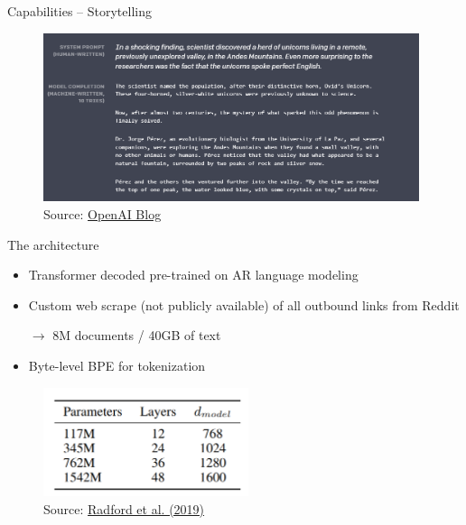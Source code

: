 \begin{frame}{Capabilities -- Storytelling}

\vfill

\begin{figure}
\centering
\includegraphics[width = 11cm]{figure/gpt2-story.png}\\ 
\footnotesize{Source:} \href{https://openai.com/blog/better-language-models/\#sample1}{\footnotesize OpenAI Blog}
\end{figure}

\vfill

\end{frame}


\begin{frame}{The architecture}

\vfill

\begin{itemize}
	\item Transformer decoded pre-trained on AR language modeling
	\item Custom web scrape (not publicly available) of all outbound links from Reddit
	\item[$\to$] 8M documents / 40GB of text
	\item Byte-level BPE for tokenization
\end{itemize}

\begin{figure}
\centering
\includegraphics[width = 6cm]{figure/gpt2-size.png}\\ 
\footnotesize{Source:} \href{https://cdn.openai.com/better-language-models/language_models_are_unsupervised_multitask_learners.pdf}{\footnotesize Radford et al. (2019)}
\end{figure}

\vfill

\end{frame}

